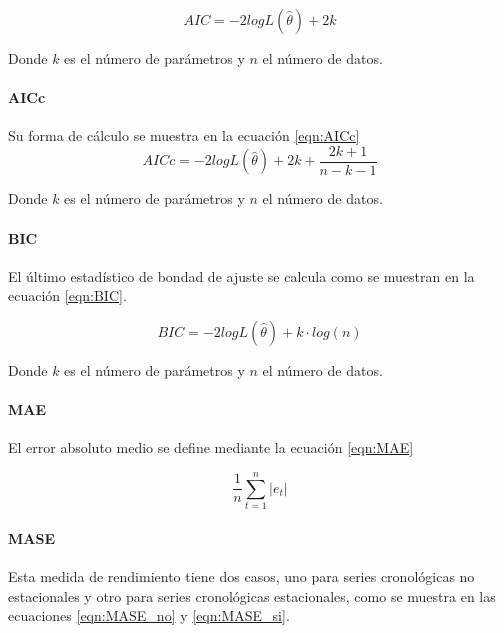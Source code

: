 \documentclass[
]{article}
\begin{document}
\begin{equation}
\label{eqn:AIC}
AIC=-2logL\left(\hat\theta\right)+2k
\end{equation}

Donde \(k\) es el número de parámetros y \(n\) el número de datos.

\paragraph{AICc}

Su forma de cálculo se muestra en la ecuación \ref{eqn:AICc}
\begin{equation}
\label{eqn:AICc}
AICc=-2logL\left(\hat\theta\right)+2k+\frac{2k+1}{n-k-1}
\end{equation}

Donde \(k\) es el número de parámetros y \(n\) el número de datos.

\paragraph{BIC}

El último estadístico de bondad de ajuste se calcula como se muestran en
la ecuación \ref{eqn:BIC}.

\begin{equation}
\label{eqn:BIC}
BIC=-2logL\left(\hat\theta\right)+k\cdot log(n)
\end{equation}

Donde \(k\) es el número de parámetros y \(n\) el número de datos.

\paragraph{MAE}

El error absoluto medio se define mediante la ecuación \ref{eqn:MAE}

\begin{equation}
\label{eqn:MAE}
\frac{1}{n}\sum_{t=1}^n |e_t|
\end{equation}

\paragraph{MASE}

Esta medida de rendimiento tiene dos casos, uno para series cronológicas
no estacionales y otro para series cronológicas estacionales, como se
muestra en las ecuaciones \ref{eqn:MASE_no} y \ref{eqn:MASE_si}.
\end{document}
